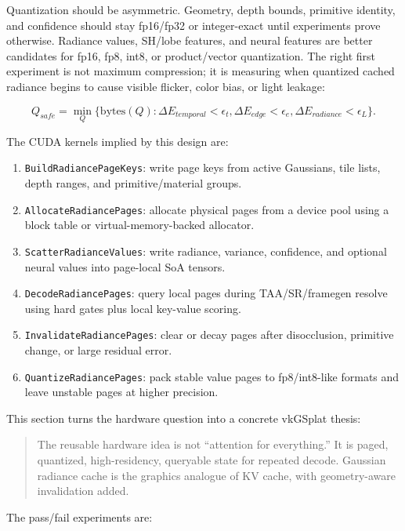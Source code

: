 \documentclass[11pt]{article}
\begin{document}
Quantization should be asymmetric. Geometry, depth bounds, primitive identity,
and confidence should stay fp16/fp32 or integer-exact until experiments prove
otherwise. Radiance values, SH/lobe features, and neural features are better
candidates for fp16, fp8, int8, or product/vector quantization. The right first
experiment is not maximum compression; it is measuring when quantized cached
radiance begins to cause visible flicker, color bias, or light leakage:

\[
  Q_{safe} = \min_Q
  \{\mathrm{bytes}(Q):\Delta E_{temporal}<\epsilon_t,
                    \Delta E_{edge}<\epsilon_e,
                    \Delta E_{radiance}<\epsilon_L\}.
\]

The CUDA kernels implied by this design are:

\begin{enumerate}
  \item \texttt{BuildRadiancePageKeys}: write page keys from active Gaussians,
        tile lists, depth ranges, and primitive/material groups.
  \item \texttt{AllocateRadiancePages}: allocate physical pages from a device
        pool using a block table or virtual-memory-backed allocator.
  \item \texttt{ScatterRadianceValues}: write radiance, variance, confidence,
        and optional neural values into page-local SoA tensors.
  \item \texttt{DecodeRadiancePages}: query local pages during TAA/SR/framegen
        resolve using hard gates plus local key-value scoring.
  \item \texttt{InvalidateRadiancePages}: clear or decay pages after
        disocclusion, primitive change, or large residual error.
  \item \texttt{QuantizeRadiancePages}: pack stable value pages to fp8/int8-like
        formats and leave unstable pages at higher precision.
\end{enumerate}

This section turns the hardware question into a concrete vkGSplat thesis:

\begin{quote}
The reusable hardware idea is not ``attention for everything.'' It is paged,
quantized, high-residency, queryable state for repeated decode. Gaussian
radiance cache is the graphics analogue of KV cache, with geometry-aware
invalidation added.
\end{quote}

The pass/fail experiments are:
\end{document}
